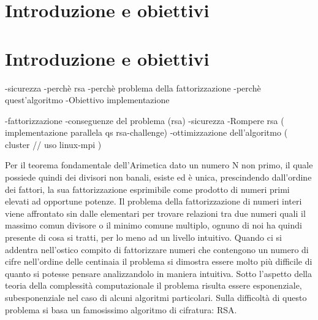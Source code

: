 \section{Introduzione e obiettivi}
\label{sec:introduzione}

\section{Introduzione e obiettivi}
\label{sec:introduzione}

-sicurezza
-perchè rsa
-perchè problema della fattorizzazione
-perchè quest'algoritmo
-Obiettivo implementazione


-fattorizzazione
-conseguenze del problema (rsa)
-sicurezza
-Rompere rsa ( implementazione parallela qs rsa-challenge)
-ottimizzazione dell'algoritmo
		( cluster // uso linux-mpi )


Per il teorema fondamentale dell'Arimetica dato un numero N non primo, il quale possiede quindi dei divisori non banali, esiste ed è unica, prescindendo dall'ordine dei fattori, la sua fattorizzazione esprimibile come prodotto di numeri primi elevati ad opportune potenze.
Il problema della fattorizzazione di numeri interi viene affrontato sin dalle elementari per trovare relazioni tra due numeri quali il massimo comun divisore o il minimo comune multiplo, ognuno di noi ha quindi presente di cosa si tratti, per lo meno ad un livello intuitivo.
Quando ci si addentra nell'ostico compito di fattorizzare numeri che contengono un numero di cifre nell'ordine delle centinaia il problema si dimostra essere molto più difficile di quanto si potesse pensare analizzandolo in maniera intuitiva.
Sotto l'aspetto della teoria della complessità computazionale il problema risulta essere esponenziale, subesponenziale nel caso di alcuni algoritmi particolari.
Sulla difficoltà di questo problema si basa un famosissimo algoritmo di cifratura: RSA.

